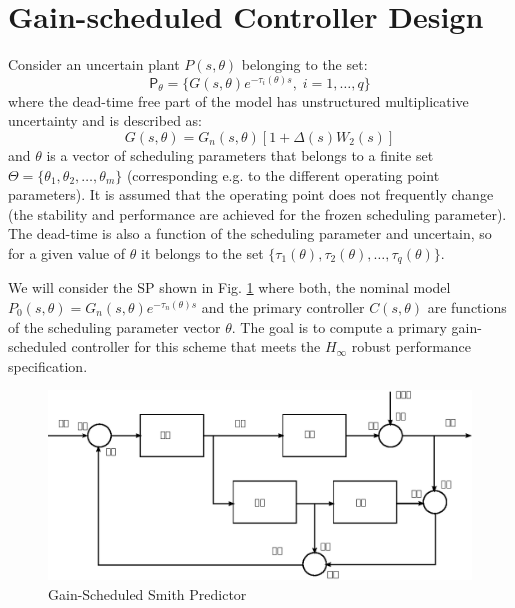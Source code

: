 \documentclass[default]{svmult}
\begin{document}
\section{Gain-scheduled Controller Design}
\label{sec:5}
Consider an uncertain plant $P(s,\theta)$ belonging to the set:
\begin{equation}
\mathsf{P}_\theta=\{G(s,\theta)e^{-\tau_i(\theta)s}, \; i=1,\dots, q \}
\end{equation}
where the dead-time free part of the model has unstructured multiplicative uncertainty and is described as:
\begin{equation}
G(s,\theta)=G_n(s,\theta)[1+\Delta(s) W_2(s)]
\end{equation}
and $\theta$ is a vector of scheduling parameters that belongs to a finite set $\Theta=\{\theta_1, \theta_2, \ldots, \theta_m   \}$ (corresponding e.g. to the different operating point parameters). It is assumed that the operating point does not frequently change (the stability and performance are achieved for the frozen scheduling parameter). The dead-time is also a function of the scheduling parameter and uncertain, so for a given value of $\theta$ it belongs to the set $\{ \tau_1(\theta), \tau_2(\theta), \ldots, \tau_q(\theta)    \}$. 

We will consider the SP shown in Fig. \ref{fig:dtc_lpv} where both, the nominal model $P_0(s,\theta)=G_n(s,\theta)e^{-\tau_n(\theta)s}$ and the primary controller $C(s,\theta)$ are functions of the scheduling parameter vector $\theta$. The goal is to compute a primary gain-scheduled controller for this scheme that meets the $H_\infty$ robust performance specification. 
\begin{figure}
\centering
{}
\includegraphics[scale=0.7]{fig/SISO_block.eps}
\caption{Gain-Scheduled Smith Predictor}
\label{fig:dtc_lpv}
\end{figure}%
 
\end{document}
